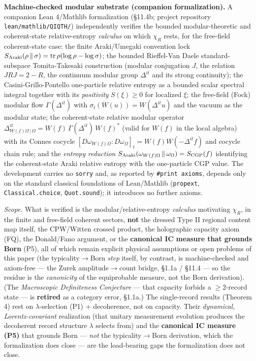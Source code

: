 \documentclass[11pt,a4paper]{article}
\begin{document}
\textbf{Machine-checked modular substrate (companion formalization).} A companion Lean 4/Mathlib formalization (§11.4b; project repository \texttt{lean/mathlib/QIQTH/}) independently verifies the bounded modular-theoretic and coherent-state relative-entropy \emph{calculus} on which $\chi_R$ rests, for the free-field coherent-state case: the finite Araki/Umegaki convention lock $S_{\rm Araki}(\rho\,\|\,\sigma)=\operatorname{tr}\rho(\log\rho-\log\sigma)$; the bounded Rieffel-Van Daele standard-subspace Tomita-Takesaki construction (modular conjugation $J$, the relation $JRJ=2-R$, the continuum modular group $\Delta^{it}$ and its strong continuity); the Casini-Grillo-Pontello one-particle relative entropy as a bounded scalar spectral integral together with its \emph{positivity} $S(\xi)\ge 0$ for localized $\xi$; the free-field (Fock) modular flow $\Gamma(\Delta^{it})$ with $\sigma_t(W(u))=W(\Delta^{it}u)$ and the vacuum as the modular state; the coherent-state relative modular operator $\Delta^{it}_{W(f)\Omega\,|\,\Omega}=W(f)\,\Gamma(\Delta^{it})\,W(f)^*$ (valid for $W(f)$ in the local algebra) with its Connes cocycle $[D\omega_{W(f)\Omega}:D\omega_\Omega]_t=W(f)W(-\Delta^{it}f)$ and cocycle chain rule; and the \emph{entropy reduction} $S_{\rm Araki}(\omega_{W(f)\Omega}\,\|\,\omega_\Omega)=S_{\rm CGP}(f)$ identifying the coherent-state Araki relative entropy with the one-particle CGP value. The development carries no \texttt{sorry} and, as reported by \texttt{\#print axioms}, depends only on the standard classical foundations of Lean/Mathlib (\texttt{propext}, \texttt{Classical.choice}, \texttt{Quot.sound}); it introduces no further axioms.

\emph{Scope.} What is verified is the modular/relative-entropy \emph{calculus} motivating $\chi_R$, in the finite and free-field coherent sectors, \textbf{not} the dressed Type II regional content map itself, the CPW/Witten crossed product, the holographic capacity axiom (FQ), the Donald/Fano argument, or the \textbf{canonical IC measure that grounds Born} (P5), all of which remain explicit physical assumptions or open problems of this paper (the typicality$\to$Born \emph{step} itself, by contrast, is machine-checked and axiom-free — the Zurek amplitude$\to$count bridge, §1.1a / §11.4 — so the residue is the \emph{canonicity} of the equiprobable measure, not the Born derivation). (The \emph{Macroscopic Definiteness Conjecture} — that capacity forbids a $\ge 2$-record state — is \textbf{retired} as a category error, §1.1a.) The single-record results (Theorem 4) rest on $\lambda$-selection (P1) + decoherence, not on capacity. Their \emph{dynamical, Lorentz-covariant} realization (that unitary measurement evolution produces the decoherent record structure $\lambda$ selects from) and the \textbf{canonical IC measure (P5)} that grounds Born — \emph{not} the typicality$\to$Born derivation, which the formalization does close — are the load-bearing gaps the formalization does not close.
\end{document}
